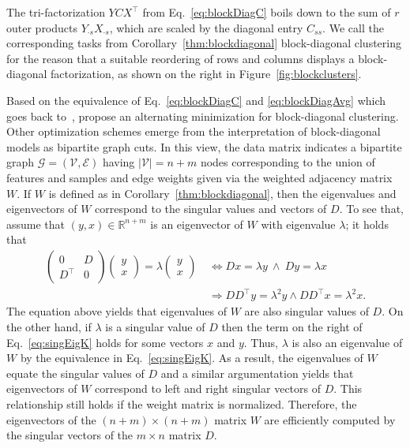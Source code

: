 The tri-factorization $YCX^\top$ from Eq.~\@\eqref{eq:blockDiagC} boils down to the sum of $r$ outer products $Y_{\cdot s}X_{\cdot s}$, which are scaled by the diagonal entry $C_{ss}$. We call the corresponding tasks from Corollary~\ref{thm:blockdiagonal} block-diagonal clustering for the reason that a suitable reordering of rows and columns displays a block-diagonal factorization, as shown on the right in Figure~\ref{fig:blockclusters}.

Based on the equivalence of Eq.~\eqref{eq:blockDiagC} and \eqref{eq:blockDiagAvg} which goes back to~\cite{mirkin1995additive}, \cite{han2017bilateral} propose an alternating minimization for block-diagonal clustering.
Other optimization schemes emerge from the interpretation of 
block-diagonal models as bipartite graph cuts. In this view, the data matrix indicates a bipartite graph $\mathcal{G}=(\mathcal{V},\mathcal{E})$ having $|\mathcal{V}|=n+m$ nodes corresponding to the union of features and samples and edge weights given via the weighted adjacency matrix $W$.
If $W$ is defined as in Corollary~\ref{thm:blockdiagonal}, then the eigenvalues and eigenvectors of $W$ correspond to the singular values and vectors of $D$. To see that, assume that $(y,x)\in\mathbb{R}^{n+m}$ is an eigenvector of $W$ with eigenvalue $\lambda$; it holds that
\begin{align}
\begin{pmatrix}
0 & D\\
D^\top & 0
\end{pmatrix}
\begin{pmatrix}
y\\x
\end{pmatrix}
= \lambda \begin{pmatrix}
y\\ x
\end{pmatrix}\ 
&\Leftrightarrow Dx=\lambda y \ \wedge \ Dy=\lambda x\label{eq:singEigK}\\
&\Rightarrow DD^\top y = \lambda^2 y \wedge DD^\top x=\lambda^2 x. \nonumber
\end{align}
The equation above yields that eigenvalues of $W$ are also singular values of $D$. On the other hand, if $\lambda$ is a singular value of $D$ then the term on the right of Eq.~\eqref{eq:singEigK} holds for some vectors $x$ and $y$. Thus, $\lambda$ is also an eigenvalue of $W$ by the equivalence in Eq.~\eqref{eq:singEigK}. As a result, the eigenvalues of $W$ equate the singular values of $D$ and a similar argumentation yields that eigenvectors of $W$ correspond to left and right singular vectors of $D$. This relationship still holds if the weight matrix is normalized. Therefore, the eigenvectors of the $(n+m)\times (n+m)$ matrix $W$ are efficiently computed by the singular vectors of the $m\times n$ matrix $D$. 

